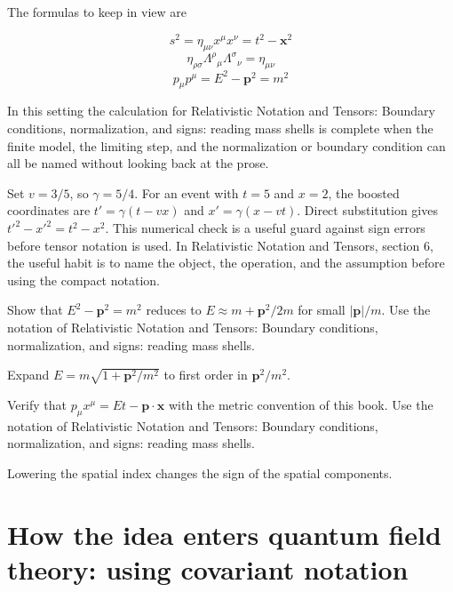 The formulas to keep in view are

\[
  s^2=\eta_{\mu\nu}x^\mu x^\nu=t^2-\bm x^2
\]
\[
  \eta_{\rho\sigma}\Lambda^\rho{}_\mu\Lambda^\sigma{}_\nu=\eta_{\mu\nu}
\]
\[
  p_\mu p^\mu=E^2-\bm p^2=m^2
\]

In this setting the calculation for Relativistic Notation and Tensors: Boundary conditions, normalization, and signs: reading mass shells is complete when the finite model, the limiting step, and the normalization or boundary condition can all be named without looking back at the prose.




\begin{example}
Set \(v=3/5\), so \(\gamma=5/4\).  For an event with \(t=5\) and \(x=2\), the boosted coordinates are \(t'=\gamma(t-vx)\) and \(x'=\gamma(x-vt)\).  Direct substitution gives \(t'^2-x'^2=t^2-x^2\).  This numerical check is a useful guard against sign errors before tensor notation is used.  In Relativistic Notation and Tensors, section 6, the useful habit is to name the object, the operation, and the assumption before using the compact notation.
\end{example}



\begin{exercise}
Show that \(E^2-\bm p^2=m^2\) reduces to \(E\approx m+\bm p^2/2m\) for small \(|\bm p|/m\).  Use the notation of Relativistic Notation and Tensors: Boundary conditions, normalization, and signs: reading mass shells.
\begin{answer}
Expand \(E=m\sqrt{1+\bm p^2/m^2}\) to first order in \(\bm p^2/m^2\).
\end{answer}
\end{exercise}

\begin{exercise}
Verify that \(p_\mu x^\mu=Et-\bm p\cdot\bm x\) with the metric convention of this book.  Use the notation of Relativistic Notation and Tensors: Boundary conditions, normalization, and signs: reading mass shells.
\begin{answer}
Lowering the spatial index changes the sign of the spatial components.
\end{answer}
\end{exercise}



\section{How the idea enters quantum field theory: using covariant notation}

